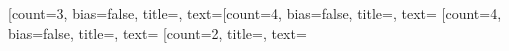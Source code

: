 \documentclass{article}
\begin{document}
\begin{neuralnetwork}[height=4]
    \newcommand{\nodetextclear}[2]{}
    \newcommand{\nodetextx}[2]{}
    \newcommand{\nodetexty}[2]{}
    [count=3, bias=false, title=, text=\nodetextx]
    \hiddenlayer[count=4, bias=false, title=, text=\nodetextclear] \linklayers
    \hiddenlayer[count=4, bias=false, title=, text=\nodetextclear] \linklayers
    \outputlayer[count=2, title=, text=\nodetexty] \linklayers
\end{neuralnetwork}
\end{document}
